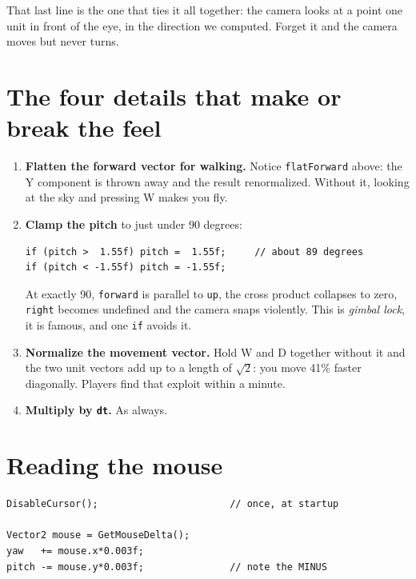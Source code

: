 That last line is the one that ties it all together: the camera looks at a point
one unit in front of the eye, in the direction we computed. Forget it and the
camera moves but never turns.

\section{The four details that make or break the feel}

\begin{enumerate}[leftmargin=*,itemsep=5pt]
  \item \textbf{Flatten the forward vector for walking.} Notice
        \lstinline|flatForward| above: the Y component is thrown away and the
        result renormalized. Without it, looking at the sky and pressing W makes
        you fly.

  \item \textbf{Clamp the pitch} to just under 90 degrees:
\begin{lstlisting}
if (pitch >  1.55f) pitch =  1.55f;     // about 89 degrees
if (pitch < -1.55f) pitch = -1.55f;
\end{lstlisting}
        At exactly 90, \lstinline|forward| is parallel to \lstinline|up|, the
        cross product collapses to zero, \lstinline|right| becomes undefined and
        the camera snaps violently. This is \emph{gimbal lock}, it is famous, and
        one \lstinline|if| avoids it.

  \item \textbf{Normalize the movement vector.} Hold W and D together without it
        and the two unit vectors add up to a length of $\sqrt{2}$: you move 41\%
        faster diagonally. Players find that exploit within a minute.

  \item \textbf{Multiply by \lstinline|dt|.} As always.
\end{enumerate}

\section{Reading the mouse}

\begin{lstlisting}
DisableCursor();                       // once, at startup

Vector2 mouse = GetMouseDelta();
yaw   += mouse.x*0.003f;
pitch -= mouse.y*0.003f;               // note the MINUS
\end{lstlisting}

